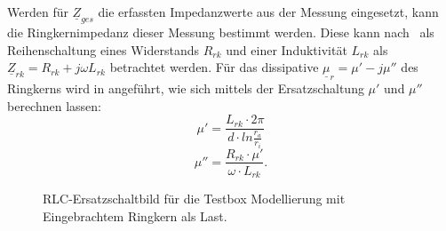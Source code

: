             Werden für $\underline{Z}_{ges}$ die erfassten Impedanzwerte aus der Messung eingesetzt, kann die Ringkernimpedanz dieser Messung bestimmt werden.
            Diese kann nach~\citep{Klingbeil2008} als Reihenschaltung eines Widerstands $R_{rk}$ und einer Induktivität $L_{rk}$ als $\underline{Z}_{rk} = R_{rk}+j\omega L_{rk}$ betrachtet werden. Für das dissipative $\underline{\mu}_r = \mu' -j\mu''$  des Ringkerns wird in \citep{bast2017ba} angeführt, wie sich mittels der Ersatzschaltung $\mu'$ und $\mu''$ berechnen lassen:
                \begin{equation}
                    \mu' = \frac{L_{rk}\cdot 2\pi}{d\cdot ln\frac{r_a}{r_i}}
                \end{equation} 
                \begin{equation}
                \mu'' = \frac{R_{rk}\cdot\mu'}{\omega\cdot L_{rk}} .
                \end{equation}
            
                \begin{figure}[htb]
                    \centering
                    \caption{RLC-Ersatzschaltbild f\"ur die Testbox Modellierung mit Eingebrachtem Ringkern als Last.}
                    \label{fig:BoxRKCircuit}
                \end{figure}
                
